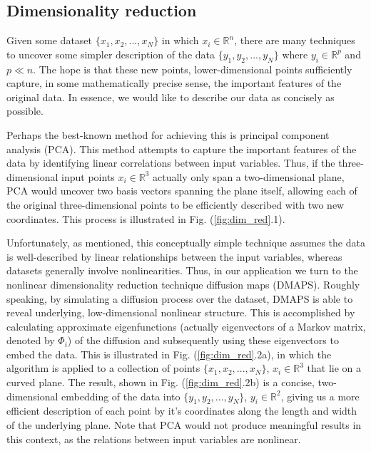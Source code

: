 \documentclass[11pt]{article}
\begin{document}
\begin{multicols}{2}

\section{Dimensionality reduction}

Given some dataset $\{x_1, x_2, ..., x_N\}$ in which $x_i \in \mathbb{R}^n$, there are many techniques to uncover some simpler description of the data $\{y_1, y_2, ..., y_N\}$ where $y_i \in \mathbb{R}^p$ and $p \ll n$. The hope is that these new points, lower-dimensional points sufficiently capture, in some mathematically precise sense, the important features of the original data. In essence, we would like to describe our data as concisely as possible.

Perhaps the best-known method for achieving this is principal component analysis (PCA). This method attempts to capture the important features of the data by identifying linear correlations between input variables. Thus, if the three-dimensional input points $x_i \in \mathbb{R}^3$ actually only span a two-dimensional plane, PCA would uncover two basis vectors spanning the plane itself, allowing each of the original three-dimensional points to be efficiently described with two new coordinates. This process is illustrated in Fig. (\ref{fig:dim_red}.1).

Unfortunately, as mentioned, this conceptually simple technique assumes the data is well-described by linear relationships between the input variables, whereas datasets generally involve nonlinearities. Thus, in our application we turn to the nonlinear dimensionality reduction technique diffusion maps (DMAPS). Roughly speaking, by simulating a diffusion process over the dataset, DMAPS is able to reveal underlying, low-dimensional nonlinear structure. This is accomplished by calculating approximate eigenfunctions (actually eigenvectors of a Markov matrix, denoted by $\Phi_i$) of the diffusion and subsequently using these eigenvectors to embed the data. This is illustrated in Fig. (\ref{fig:dim_red}.2a), in which the algorithm is applied to a collection of points $\{x_1, x_2, ..., x_N\}$, $x_i \in \mathbb{R}^3$ that lie on a curved plane. The result, shown in Fig. (\ref{fig:dim_red}.2b) is a concise, two-dimensional embedding of the data into $\{y_1, y_2, ..., y_N\}$, $y_i \in \mathbb{R}^2$, giving us a more efficient description of each point by it's coordinates along the length and width of the underlying plane. Note that PCA would not produce meaningful results in this context, as the relations between input variables are nonlinear.

\end{multicols}
\end{document}
